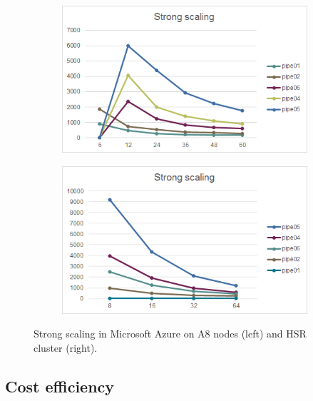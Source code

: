 \documentclass[3p,times]{elsarticle}
\begin{document}
\begin{figure}
\centering
\begin{subfigure}{.4\textwidth}
  \centering
			\includegraphics[width=\linewidth]{strongHSR}	
  \label{fig:strongA8}
\end{subfigure}%
\begin{subfigure}{.5\textwidth}
  \centering
  \includegraphics[width=\linewidth]{strongA8}
  \label{fig:strongHSR}
\end{subfigure}
\caption{Strong scaling in Microsoft Azure on A8 nodes (left) and HSR cluster (right). }
\label{fig:strongPipe}
\end{figure}

\subsection{Cost efficiency}
\end{document}
